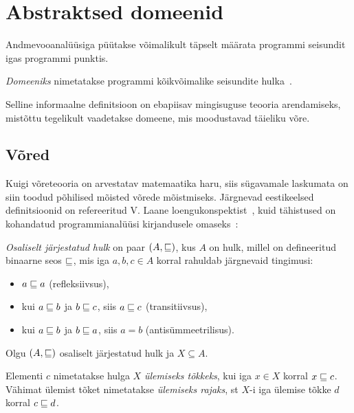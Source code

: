 \documentclass[../thesis.tex]{subfiles}
\begin{document}
\section{Abstraktsed domeenid}

Andmevooanalüüsiga püütakse võimalikult täpselt määrata programmi seisundit igas programmi punktis.

\begin{definition}
\emph{Domeeniks} nimetatakse programmi kõikvõimalike seisundite hulka~\cite{vojdani_magister}.
\end{definition}

Selline informaalne definitsioon on ebapiisav mingisuguse teooria arendamiseks, mistõttu tegelikult vaadetakse domeene, mis moodustavad täieliku võre.

\subsection{Võred}

Kuigi võreteooria on arvestatav matemaatika haru, siis sügavamale laskumata on siin toodud põhilised mõisted võrede mõistmiseks.
Järgnevad eestikeelsed definitsioonid on refereeritud V. Laane loengukonspektist~\cite{laan_voreteooria}, kuid tähistused on kohandatud programmianalüüsi kirjandusele omaseks~\cite[17]{seidl_foundations}:

\begin{definition}
\emph{Osaliselt järjestatud hulk} on paar $(A, \sqsubseteq)$, kus $A$ on hulk, millel on defineeritud binaarne seos $\sqsubseteq$, mis iga $a, b, c \in A$ korral rahuldab järgnevaid tingimusi:
\begin{itemize}[nosep]
	\item $a \sqsubseteq a$ (refleksiivsus),
	\item kui $a \sqsubseteq b$ ja $b \sqsubseteq c$, siis $a \sqsubseteq c$ (transitiivsus),
	\item kui $a \sqsubseteq b$ ja $b \sqsubseteq a$, siis $a = b$ (antisümmeetrilisus).
\end{itemize}
\end{definition}

Olgu $(A, \sqsubseteq)$ osaliselt järjestatud hulk ja $X \subseteq A$.

\begin{definition}
Elementi $c$ nimetatakse hulga $X$ \emph{ülemiseks tõkkeks}, kui iga $x \in X$ korral $x \sqsubseteq c$. Vähimat ülemist tõket nimetatakse \emph{ülemiseks rajaks}, st $X$-i iga ülemise tõkke $d$ korral $c \sqsubseteq d$.
\end{definition}
\end{document}
